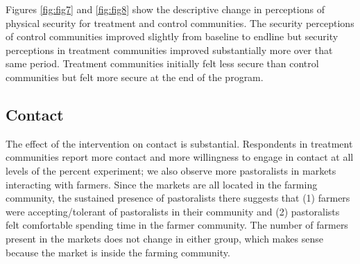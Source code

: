 \documentclass[11pt]{article}
\begin{document}
Figures \ref{fig:fig7} and \ref{fig:fig8} show the descriptive change in
perceptions of physical security for treatment and control communities.
The security perceptions of control communities improved slightly from
baseline to endline but security perceptions in treatment communities
improved substantially more over that same period. Treatment communities
initially felt less secure than control communities but felt more secure
at the end of the program.

\hypertarget{contact}{%
\subsection{Contact}\label{contact}}

The effect of the intervention on contact is substantial. Respondents in
treatment communities report more contact and more willingness to engage
in contact at all levels of the percent experiment; we also observe more
pastoralists in markets interacting with farmers. Since the markets are
all located in the farming community, the sustained presence of
pastoralists there suggests that (1) farmers were accepting/tolerant of
pastoralists in their community and (2) pastoralists felt comfortable
spending time in the farmer community. The number of farmers present in
the markets does not change in either group, which makes sense because
the market is inside the farming community.
\end{document}
